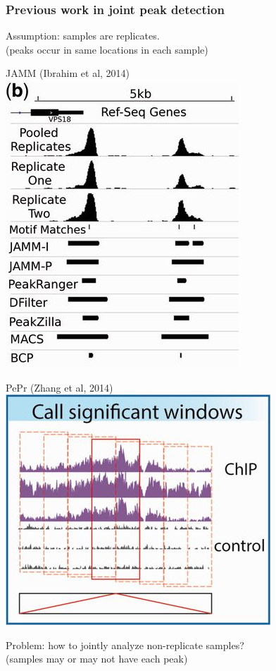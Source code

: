 \documentclass{beamer}
\begin{document}
\begin{frame}
  \frametitle{Previous work in joint peak detection}
  Assumption: samples are replicates.\\
  (peaks occur in same locations in each sample)

  \vskip 0.2cm

  \parbox[t]{0.45\linewidth}{
    \centering 
    JAMM (Ibrahim et al, 2014)
    \includegraphics[width=0.9\linewidth]{JAMM-cropped}
  }
  \linewidth
  \parbox[t]{0.4\linewidth}{
    \centering
    PePr (Zhang et al, 2014)
    \includegraphics[width=\linewidth]{PePr-cropped}
  }

  \vskip 0.2cm

  Problem: how to jointly analyze non-replicate samples?\\
  (samples may or may not have each peak)
\end{frame}
\end{document}
